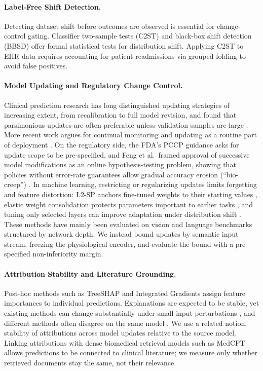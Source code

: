 \documentclass[10pt,a4paper,twocolumn]{article}
\begin{document}
	\paragraph{Label-Free Shift Detection.}
	Detecting dataset shift before outcomes are observed is essential for change-control gating. Classifier two-sample tests (C2ST) \citep{lopez2017c2st} and black-box shift detection (BBSD) \citep{rabanser2019failingloudly} offer formal statistical tests for distribution shift. Applying C2ST to EHR data requires accounting for patient readmissions via grouped folding to avoid false positives.
	
	\paragraph{Model Updating and Regulatory Change Control.}
	Clinical prediction research has long distinguished updating strategies of increasing extent, from recalibration to full model revision, and found that parsimonious updates are often preferable unless validation samples are large \citep{steyerberg2004validation}. More recent work argues for continual monitoring and updating as a routine part of deployment \citep{jenkins2021continual,feng2022clinical}. On the regulatory side, the FDA's PCCP guidance \citep{fda2024pccp} asks for update scope to be pre-specified, and Feng et al.\ framed approval of successive model modifications as an online hypothesis-testing problem, showing that policies without error-rate guarantees allow gradual accuracy erosion (``bio-creep'') \citep{feng2021approval}. In machine learning, restricting or regularizing updates limits forgetting and feature distortion: L2-SP anchors fine-tuned weights to their starting values \citep{li2018l2sp}, elastic weight consolidation protects parameters important to earlier tasks \citep{kirkpatrick2017overcoming}, and tuning only selected layers can improve adaptation under distribution shift \citep{kumar2022finetuning,lee2023surgical}. These methods have mainly been evaluated on vision and language benchmarks structured by network depth. We instead bound updates by semantic input stream, freezing the physiological encoder, and evaluate the bound with a pre-specified non-inferiority margin.
	
	\paragraph{Attribution Stability and Literature Grounding.}
	Post-hoc methods such as TreeSHAP \citep{lundberg2020shap} and Integrated Gradients \citep{sundararajan2017axiomatic} assign feature importances to individual predictions. Explanations are expected to be stable, yet existing methods can change substantially under small input perturbations \citep{alvarezmelis2018robustness}, and different methods often disagree on the same model \citep{krishna2024disagreement}. We use a related notion, stability of attributions across model updates relative to the source model. Linking attributions with dense biomedical retrieval models such as MedCPT \citep{jin2023medcpt} allows predictions to be connected to clinical literature; we measure only whether retrieved documents stay the same, not their relevance.
	
\end{document}
